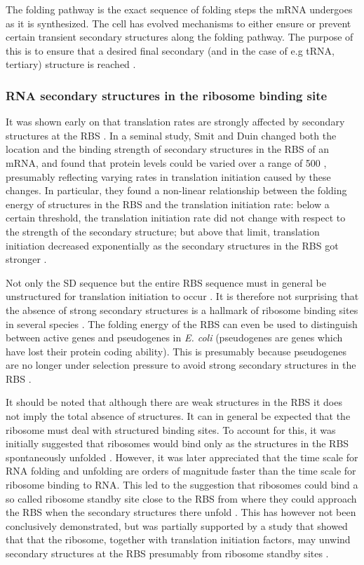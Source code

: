 The folding pathway is the exact sequence of folding steps the mRNA undergoes
as it is synthesized. The cell has evolved mechanisms to either ensure or
prevent certain transient secondary structures along the folding pathway. The
purpose of this is to ensure that a desired final secondary (and in the case of
e.g tRNA, tertiary) structure is reached \cite{pan_rna_2006-1}.

\subsubsection{RNA secondary structures in the ribosome binding site}
It was shown early on that translation rates are strongly affected by secondary
structures at the RBS \cite{hall_role_1982}. In a seminal study, Smit and Duin
changed both the location and the binding strength of secondary structures in
the RBS of an mRNA, and found that protein levels could be varied over a range
of 500 \cite{de_smit_secondary_1990}, presumably reflecting varying rates in
translation initiation caused by these changes. In particular, they found a
non-linear relationship between the folding energy of structures in the RBS and
the translation initiation rate: below a certain threshold, the translation
initiation rate did not change with respect to the strength of the secondary
structure; but above that limit, translation initiation decreased exponentially
as the secondary structures in the RBS got stronger
\cite{de_smit_secondary_1990}.

Not only the SD sequence but the entire RBS sequence must in general be
unstructured for translation initiation to occur \cite{seo_quantitative_2009}.
It is therefore not surprising that the absence of strong secondary structures
is a hallmark of ribosome binding sites in several species
\cite{gu_universal_2010}. The folding energy of the RBS can even be used to
distinguish between active genes and pseudogenes in \textit{E.  coli}
(pseudogenes are genes which have lost their protein coding ability). This is
presumably because pseudogenes are no longer under selection pressure to avoid
strong secondary structures in the RBS \cite{keller_reduced_2012}.

It should be noted that although there are weak structures in the RBS it does
not imply the total absence of structures. It can in general be expected that
the ribosome must deal with structured binding sites. To account for this, it
was initially suggested that ribosomes would bind only as the structures in the
RBS spontaneously unfolded \cite{de_smit_translational_1994}. However, it was
later appreciated that the time scale for RNA folding and unfolding are orders
of magnitude faster than the time scale for ribosome binding to RNA. This led
to the suggestion that ribosomes could bind a so called ribosome standby site
close to the RBS from where they could approach the RBS when the secondary
structures there unfold \cite{de_smit_translational_2003-1}. This has however
not been conclusively demonstrated, but was partially supported by a study that
showed that that the ribosome, together with translation initiation factors,
may unwind secondary structures at the RBS presumably from ribosome standby
sites \cite{studer_unfolding_2006}.

